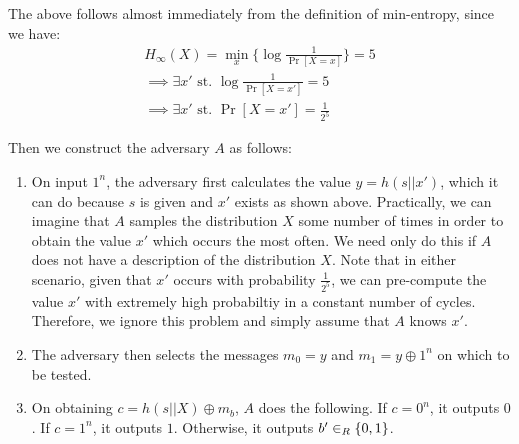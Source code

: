 \documentclass{article}
\begin{document}
\begin{enumerate}[,start=4]
\begin{enumerate}[,label=\alph*.]
The above follows almost immediately from the definition of min-entropy, since we have:%
\noindent\noindent\[%
\begin{aligned}
H_{\infty}(X) = \min_x \{\log \frac{1}{\Pr[X = x]} \} = 5 \\
\implies \exists x' \text{ st. } \log \frac{1}{\Pr[X= x']} = 5 \\
\implies  \exists x' \text{ st. } \Pr[X = x'] = \frac{1}{2^5}
\end{aligned}
\]%

Then we construct the adversary $A$ as follows:%

\begin{enumerate}[noitemsep,topsep=\mdcompacttopsep]%

\item{}On input $1^n$, the adversary first calculates the value $y = h(s || x')$, which it 
can do because $s$ is given and $x'$ exists as shown above. Practically, we can imagine
that $A$ samples the distribution $X$ some number of times in order to obtain the value
$x'$ which occurs the most often. We need only do this if $A$ does not have a description
of the distribution $X$. Note that in either scenario, given that $x'$ occurs with 
probability $\frac{1}{2^5}$, we can pre-compute the value $x'$ with extremely high 
probabiltiy in a constant number of cycles. Therefore, we ignore this problem and 
simply assume that $A$ knows $x'$.%

\item{}The adversary then selects the messages $m_0  = y$ and $m_1 = y \oplus 1^n$ on which to
be tested.%

\item{}On obtaining $c = h(s || X) \oplus m_b$, $A$ does the following. If $c = 0^n$, it outputs
$0$. If $c = 1^n$, it outputs $1$. Otherwise, it outputs $b' \in_R \{0,1\}$.%
\end{enumerate}%


\end{enumerate}
\end{enumerate}
\end{document}
